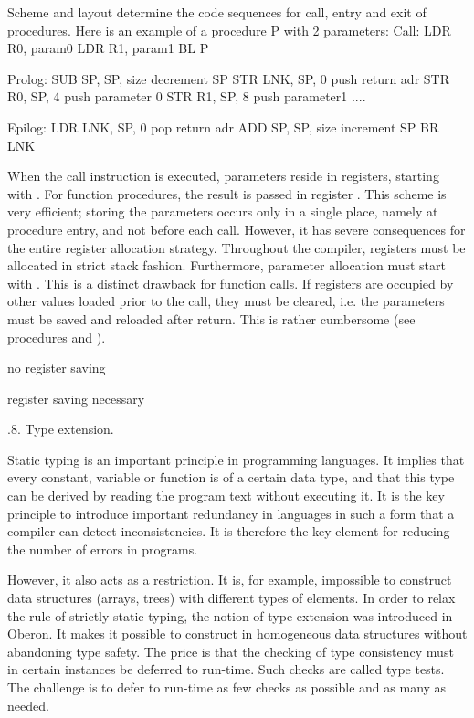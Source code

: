Scheme and layout determine the code sequences for call, entry and exit of procedures. Here is an example of a procedure P with 2 parameters:
\begintt
Call:    LDR R0, param0 
         LDR R1, param1
         BL P

Prolog:  SUB SP, SP, size   decrement SP
         STR LNK, SP, 0     push return adr 
         STR R0, SP, 4      push parameter 0 
         STR R1, SP, 8      push parameter1 ....

Epilog:  LDR LNK, SP, 0     pop return adr
         ADD SP, SP, size   increment SP
         BR LNK
\endtt

\noindent When the call instruction is executed, parameters reside in registers, starting with . For function procedures, the result is passed in register . This scheme is very efficient; storing the parameters occurs only in a single place, namely at procedure entry, and not before each call. However, it has severe consequences for the entire register allocation strategy. Throughout the compiler, registers must be allocated in strict stack fashion. Furthermore, parameter allocation must start with . This is a distinct drawback for function calls. If registers are occupied by other values loaded prior to the call, they must be cleared, i.e. the parameters must be saved and reloaded after return. This is rather cumbersome (see procedures  and ).
\smallskip
\item{}  no register saving
\item{} 
\item{} 
\item{}  register saving necessary
\smallskip

.8. Type extension.

Static typing is an important principle in programming languages. It implies that every constant, variable or function is of a certain data type, and that this type can be derived by reading the program text without executing it. It is the key principle to introduce important redundancy in languages in such a form that a compiler can detect inconsistencies. It is therefore the key element for reducing the number of errors in programs.

However, it also acts as a restriction. It is, for example, impossible to construct data structures (arrays, trees) with different types of elements. In order to relax the rule of strictly static typing, the notion of type extension was introduced in Oberon. It makes it possible to construct in homogeneous data structures without abandoning type safety. The price is that the checking of type consistency must in certain instances be deferred to run-time. Such checks are called type tests. The challenge is to defer to run-time as few checks as possible and as many as needed.

